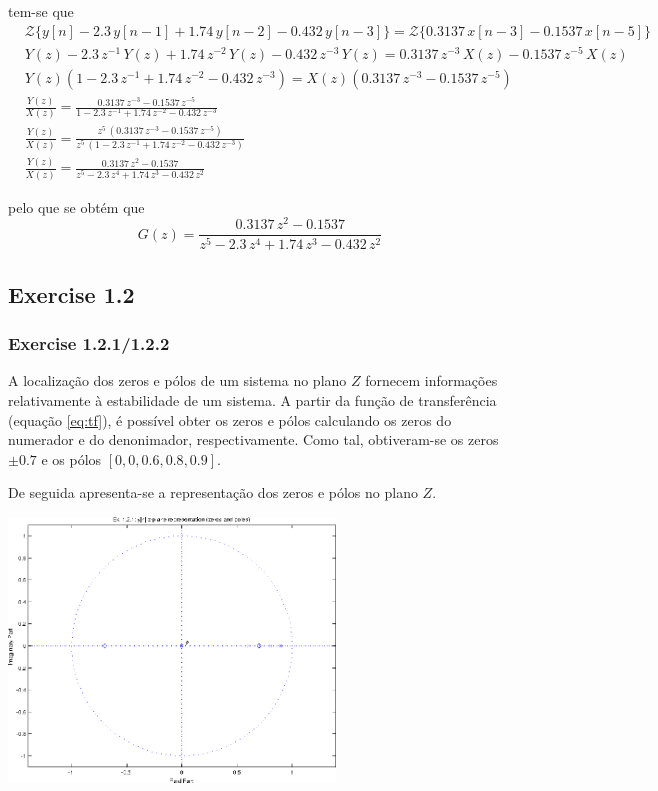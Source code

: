 \documentclass[a4paper]{article}
\begin{document}
\noindent tem-se que
\begin{eqnarray}
	&\mathcal{Z}\{y[n] - 2.3 \, y[n - 1] + 1.74 \, y[n - 2] - 0.432 \, y[n - 3]\} = \mathcal{Z}\{0.3137 \, x[n - 3] - 0.1537 \, x[n - 5]\} \\
	&Y(z) - 2.3 \, z^{-1} \, Y(z) + 1.74 \, z^{-2} \, Y(z) - 0.432 \, z^{-3} \, Y(z) = 0.3137 \, z^{-3} \, X(z) - 0.1537 \, z^{-5} \, X(z) \\
	&Y(z) (1 - 2.3 \, z^{-1} + 1.74 \, z^{-2} - 0.432 \, z^{-3}) = X(z)(0.3137 \, z^{-3} - 0.1537 \, z^{-5}) \\
	&\frac{Y(z)}{X(z)} = \frac{0.3137 \, z^{-3} - 0.1537 \, z^{-5}}{1 - 2.3 \, z^{-1} + 1.74 \, z^{-2} - 0.432 \, z^{-3}} \\
	&\frac{Y(z)}{X(z)} = \frac{z^{5} \, (0.3137 \, z^{-3} - 0.1537 \, z^{-5})}{z^{5} \, (1 - 2.3 \, z^{-1} + 1.74 \, z^{-2} - 0.432 \, z^{-3})} \\
	&\frac{Y(z)}{X(z)} = \frac{0.3137 \, z^{2} - 0.1537}{z^{5} - 2.3 \, z^{4} + 1.74 \, z^{3} - 0.432 \, z^{2}}
\end{eqnarray}

\noindent pelo que se obtém que
\begin{equation}
	\label{eq:tf}
	G(z) = \frac{0.3137 \, z^{2} - 0.1537}{z^{5} - 2.3 \, z^{4} + 1.74 \, z^{3} - 0.432 \, z^{2}}
\end{equation}

\subsection{Exercise 1.2}
\subsubsection{Exercise 1.2.1/1.2.2}
\noindent A localização dos zeros e pólos de um sistema no plano $Z$ fornecem informações relativamente à estabilidade de um sistema. A partir da função de transferência (equação \ref{eq:tf}), é possível obter os zeros e pólos calculando os zeros do numerador e do denonimador, respectivamente. Como tal, obtiveram-se os zeros $\pm 0.7$ e os pólos $[0, 0, 0.6, 0.8, 0.9]$.

\noindent De seguida apresenta-se a representação dos zeros e pólos no plano $Z$.
\begin{center}
	\includegraphics[width=0.65\textwidth]{images/ex1_2_1.png}
	\label{fig:ex1_2_1_zplane}
\end{center}
\end{document}
